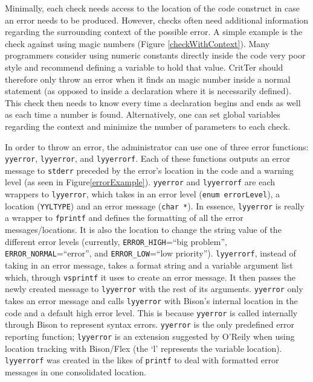 \documentclass[12pt]{report}
\def\lstlistingname{Figure}
\newcommand{\refCode}{\lstlistingname \hspace{1mm}}
\newcommand{\programName}{CritTer\xspace}
\begin{document}
Minimally, each check needs access to the location of the code construct in case an error needs to be 
produced. However, checks often need additional information regarding the surrounding context of 
the possible error. A simple example is the check against using magic numbers (\refCode 
\ref{checkWithContext}). Many programmers consider using numeric constants directly inside the code 
very poor style and recommend defining a variable to hold that value. \programName should therefore 
only throw an error when it finds an magic number inside a normal statement (as opposed to inside a 
declaration where it is necessarily defined). This check then needs to know every time a declaration 
begins and ends as well as each time a number is found. Alternatively, one can set global 
variables regarding the context and minimize the number of parameters to each check.

\newcommand{\yyerror}{\lstinline{yyerror}\xspace}
\newcommand{\lyyerror}{\lstinline{lyyerror}\xspace}
\newcommand{\lyyerrorf}{\lstinline{lyyerrorf}\xspace}

In order to throw an error, the administrator can use one of three error functions: \yyerror, \lyyerror, and 
\lyyerrorf. Each of these functions outputs an error message to \lstinline{stderr} preceded by the error's 
location in the code and a warning level (as seen in \refCode \ref{errorExample}). \yyerror and \lyyerrorf 
are each wrappers to \lyyerror, which takes in an error level (\lstinline{enum errorLevel}), a location 
(\lstinline{YYLTYPE}) and an error message (\lstinline{char *}). In essence, \lyyerror is really a wrapper 
to \lstinline{fprintf} and defines the formatting of all the error messages/locations. It is also the location 
to change the string value of the different error levels (currently, \lstinline{ERROR_HIGH}=``big 
problem'', \lstinline{ERROR_NORMAL}=``error'', and \lstinline{ERROR_LOW}=``low priority'').  
\lyyerrorf, instead of taking in an error message, takes a format string and a variable argument list 
which, through \lstinline{vsprintf} it uses to create an error message. It then passes the newly created 
message to \lyyerror with the rest of its arguments. \yyerror only takes an error message and calls 
\lyyerror with Bison's internal location in the code and a default high error level. This is because 
\yyerror is called internally through Bison to represent syntax errors. \yyerror is the only predefined 
error reporting function; \lyyerror is an extension suggested by O'Reily\cite{bison-and-flex} when using 
location tracking with Bison/Flex (the `l' represents the variable location). \lyyerrorf was created in the 
likes of \lstinline{printf} to deal with formatted error messages in one consolidated location.
\end{document}
